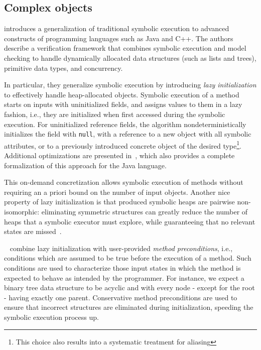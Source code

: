 
\subsection{Complex objects}
\label{ss:complex-objects}

\cite{KPV-TACAS03} introduces a generalization of traditional symbolic execution to advanced constructs of programming languages such as Java and C++. The authors describe a verification framework that combines symbolic execution and model checking to handle dynamically allocated data structures (such as lists and trees), primitive data types, and concurrency.

In particular, they generalize symbolic execution by introducing {\em lazy initialization} to effectively handle heap-allocated objects. Symbolic execution of a method starts on inputs with uninitialized fields, and assigns values to them in a lazy fashion, i.e., they are initialized when first accessed during the symbolic execution. For uninitialized reference fields, the algorithm nondeterministically initializes the field with {\tt null}, with a reference to a new object with all symbolic attributes, or to a previously introduced concrete object of the desired type\footnote{This choice also results into a systematic treatment for aliasing}. Additional optimizations are presented in~\cite{DLR-ASE12}, which also provides a complete formalization of this approach for the Java language.

This on-demand concretization allows symbolic execution of methods without requiring an a priori bound on the number of input objects. Another nice property of lazy initialization is that produced symbolic heaps are pairwise non-isomorphic: eliminating symmetric structures can greatly reduce the number of heaps that a symbolic executor must explore, while guaranteeing that no relevant states are missed~\cite{BLISS-TSE15}. 

~\cite{KPV-TACAS03,SPF-ISSTA04} combine lazy initialization with user-provided {\em method preconditions}, i.e., conditions which are assumed to be true before the execution of a method. Such conditions are used to characterize those input states in which the method is expected to behave as intended by the programmer. For instance, we expect a binary tree data structure to be acyclic and with every node - except for the root - having exactly one parent. Conservative method preconditions are used to ensure that incorrect structures are eliminated during initialization, speeding the symbolic execution process up.

